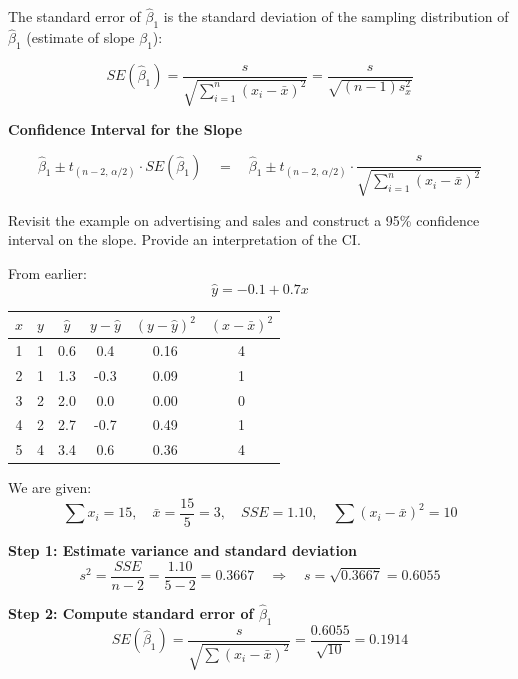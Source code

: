 The standard error of $\hat{\beta}_1$ is the standard deviation of the sampling distribution of $\hat{\beta}_1$ (estimate of slope $\beta_1$):

\[
SE(\hat{\beta}_1) = \frac{s}{\sqrt{\sum_{i=1}^{n} (x_i - \bar{x})^2}} 
= \frac{s}{\sqrt{(n - 1) s_x^2}}
\]

\vspace{1em}

\textbf{Confidence Interval for the Slope}

\[
\hat{\beta}_1 \pm t_{(n-2, \, \alpha/2)} \cdot SE(\hat{\beta}_1)
\quad = \quad 
\hat{\beta}_1 \pm t_{(n-2, \, \alpha/2)} \cdot \frac{s}{\sqrt{\sum_{i=1}^{n} (x_i - \bar{x})^2}}
\]

\begin{example}[continued]
Revisit the example on advertising and sales and construct a 95\% confidence interval on the slope. Provide an interpretation of the CI.

From earlier:
\[
\hat{y} = -0.1 + 0.7x
\]

\begin{center}
\begin{tabular}{cccccc}
\toprule
\textbf{$x$} & \textbf{$y$} & \textbf{$\hat{y}$} & \textbf{$y - \hat{y}$} & \textbf{$(y - \hat{y})^2$} & \textbf{$(x - \bar{x})^2$} \\
\midrule
1 & 1 & 0.6 & 0.4 & 0.16 & 4 \\
2 & 1 & 1.3 & -0.3 & 0.09 & 1 \\
3 & 2 & 2.0 & 0.0 & 0.00 & 0 \\
4 & 2 & 2.7 & -0.7 & 0.49 & 1 \\
5 & 4 & 3.4 & 0.6 & 0.36 & 4 \\
\bottomrule
\end{tabular}
\end{center}

\vspace{1em}
We are given:
\[
\sum x_i = 15, \quad \bar{x} = \frac{15}{5} = 3, \quad SSE = 1.10, \quad \sum (x_i - \bar{x})^2 = 10
\]

\vspace{1em}
\textbf{Step 1: Estimate variance and standard deviation}
\[
s^2 = \frac{SSE}{n-2} = \frac{1.10}{5 - 2} = 0.3667
\quad \Rightarrow \quad
s = \sqrt{0.3667} = 0.6055
\]

\vspace{1em}
\textbf{Step 2: Compute standard error of $\hat{\beta}_1$}
\[
SE(\hat{\beta}_1) = \frac{s}{\sqrt{\sum (x_i - \bar{x})^2}} 
= \frac{0.6055}{\sqrt{10}} = 0.1914
\]


\end{example}
